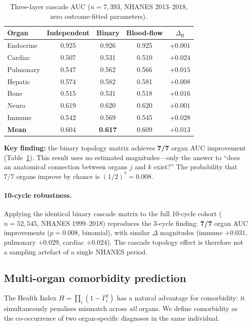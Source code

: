 \documentclass[aps,pre,twocolumn,superscriptaddress,floatfix]{revtex4-2}
\begin{document}
\begin{table}[h]
\centering
\caption{Three-layer cascade AUC
($n = 7{,}393$, NHANES 2013--2018,
zero outcome-fitted parameters).}
\label{tab:cascade-auc}
\begin{tabular}{lcccc}
\toprule
Organ & Independent & Binary & Blood-flow
  & $\Delta_{\mathrm{B}}$ \\
\midrule
Endocrine  & 0.925 & 0.926 & 0.925 & $+0.001$ \\
Cardiac    & 0.507 & 0.531 & 0.510 & $+0.024$ \\
Pulmonary  & 0.547 & 0.562 & 0.566 & $+0.015$ \\
Hepatic    & 0.574 & 0.582 & 0.581 & $+0.008$ \\
Bone       & 0.515 & 0.531 & 0.518 & $+0.016$ \\
Neuro      & 0.619 & 0.620 & 0.620 & $+0.001$ \\
Immune     & 0.542 & 0.569 & 0.545 & $+0.028$ \\
\midrule
\textbf{Mean} & 0.604 & \textbf{0.617}
  & 0.609 & $+0.013$ \\
\bottomrule
\end{tabular}
\end{table}

\textbf{Key finding:} the binary topology matrix
achieves \textbf{7/7} organ AUC improvement
(Table~\ref{tab:cascade-auc}).
This result uses no estimated magnitudes---only
the answer to ``does an anatomical connection
between organs $j$ and $k$ exist?''
The probability that 7/7 organs improve by chance
is $(1/2)^7 = 0.008$.

\paragraph{10-cycle robustness.}
Applying the identical binary cascade matrix to the
full 10-cycle cohort ($n = 52{,}545$, NHANES 1999--2018)
reproduces the 3-cycle finding: \textbf{7/7} organ AUC
improvements ($p = 0.008$, binomial), with similar
$\Delta$ magnitudes (immune $+0.031$, pulmonary $+0.029$,
cardiac $+0.024$).
The cascade topology effect is therefore not a sampling
artefact of a single NHANES period.

\subsection{Multi-organ comorbidity prediction}
\label{sec:comorbidity}

The Health Index $H = \prod_i (1-\Gamma_i^2)$
has a natural advantage for comorbidity:
it simultaneously penalises mismatch
across \emph{all} organs.
We define comorbidity as the co-occurrence
of two organ-specific diagnoses in the same
individual.
\end{document}
